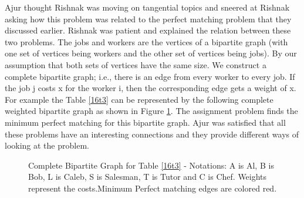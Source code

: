 Ajur thought Rishnak was moving on tangential topics and sneered at Rishnak asking how this problem was related to the perfect matching problem that they discussed earlier. Rishnak was patient and explained the relation between these two problems.
The jobs and workers are the vertices of a bipartite graph (with one set of vertices being workers and the other set of vertices being jobs). By our assumption that both sets of vertices have the same size. We
construct a complete bipartite graph; i.e., there is an edge from every worker to every job. If the job j costs x for the worker i, then the corresponding edge gets a weight of x. For example the Table \ref{16t3} can be represented by the following complete weighted bipartite graph as shown in Figure \ref{16g3}. The assignment problem finds the minimum perfect matching for this bipartite graph. Ajur was satisfied that all these problems have an interesting connections and they provide different ways of looking at the problem.
\begin{figure}
\begin{center}

\caption{Complete Bipartite Graph for Table \ref{16t3} - Notations: A is Al, B is Bob, L is Caleb, S is Salesman, T is Tutor and C is Chef. Weights represent the costs.Minimum Perfect matching edges are colored red.}\label{16g3}
\end{center}
\end{figure}

\begin{newpage}
\end{newpage}

